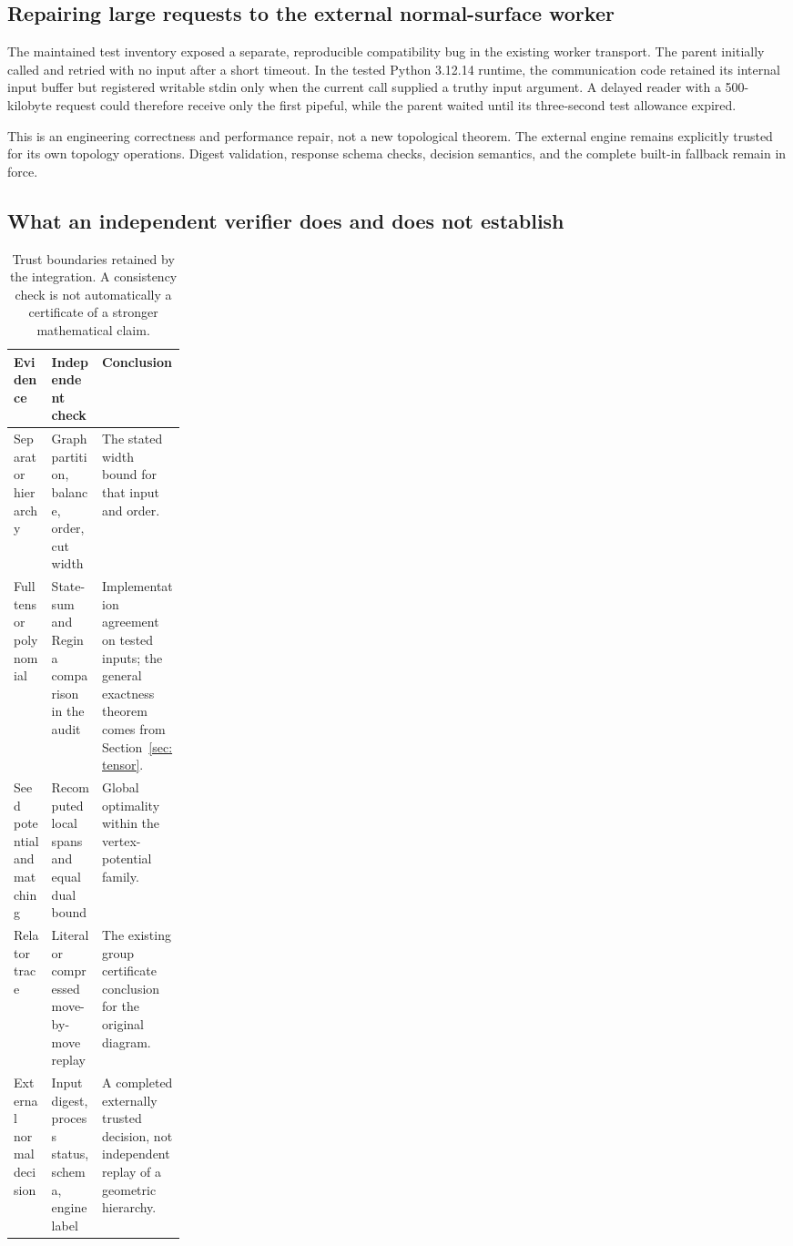 \subsection{Repairing large requests to the external normal-surface worker}

The maintained test inventory exposed a separate, reproducible compatibility
bug in the existing worker transport. The parent initially called
 and retried with no input after a
short timeout. In the tested Python 3.12.14 runtime, the communication code
retained its internal input buffer but registered writable stdin only when
the current call supplied a truthy input argument. A delayed reader with a
500-kilobyte request could therefore receive only the first pipeful, while
the parent waited until its three-second test allowance expired.



This is an engineering correctness and performance repair, not a new
topological theorem. The external engine remains explicitly trusted for
its own topology operations. Digest validation, response schema checks,
decision semantics, and the complete built-in fallback remain in force.

\subsection{What an independent verifier does and does not establish}

\begin{table}[H]
\centering\small
\begin{tabularx}{\linewidth}{@{}P{0.22\linewidth}YY@{}}
\toprule
Evidence & Independent check & Conclusion\\
\midrule
Separator hierarchy & Graph partition, balance, order, cut width &
The stated width bound for that input and order.\\[3pt]
Full tensor polynomial & State-sum and Regina comparison in the audit &
Implementation agreement on tested inputs; the general exactness theorem
comes from Section~\ref{sec:tensor}.\\[3pt]
Seed potential and matching & Recomputed local spans and equal dual bound &
Global optimality within the vertex-potential family.\\[3pt]
Relator trace & Literal or compressed move-by-move replay &
The existing group certificate conclusion for the original diagram.\\[3pt]
External normal decision & Input digest, process status, schema, engine label &
A completed externally trusted decision, not independent replay of a
geometric hierarchy.\\
\bottomrule
\end{tabularx}
\caption{Trust boundaries retained by the integration. A consistency check
is not automatically a certificate of a stronger mathematical claim.}
\end{table}

